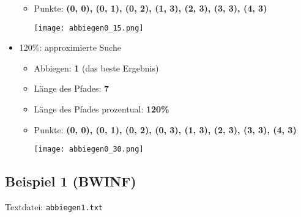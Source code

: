 \documentclass[a4paper,10pt,ngerman]{scrartcl}
\begin{document}
\begin{itemize}
\begin{itemize}
      \item Punkte: \textbf{(0, 0), (0, 1), (0, 2), (1, 3), (2, 3), (3, 3), (4, 3)}
\begin{center}
\texttt{[image: abbiegen0\_15.png]}
\end{center}
    \end{itemize}
  \item 120\%: approximierte Suche    
    \begin{itemize}
      \item Abbiegen: \textbf{1} (das beste Ergebnis)
      \item Länge des Pfades: \textbf{7}
      \item Länge des Pfades prozentual: \textbf{120\%}
      \item Punkte: \textbf{(0, 0), (0, 1), (0, 2), (0, 3), (1, 3), (2, 3), (3, 3), (4, 3)}
    \begin{center}
    \texttt{[image: abbiegen0\_30.png]}
    \end{center}
    \end{itemize}
\end{itemize}


\subsection{Beispiel 1 (BWINF)}
Textdatei: \texttt{abbiegen1.txt}
\end{document}
